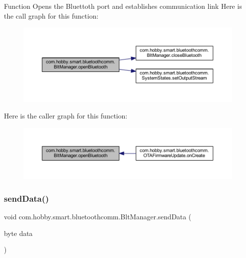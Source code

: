 Function Opens the Bluettoth port and establishes communication link Here is the call graph for this function\+:\nopagebreak
\begin{figure}[H]
\begin{center}
\leavevmode
\includegraphics[width=350pt]{classcom_1_1hobby_1_1smart_1_1bluetoothcomm_1_1_blt_manager_ae6274af1cc3ee13291cc8ef6f365a92f_cgraph}
\end{center}
\end{figure}
Here is the caller graph for this function\+:\nopagebreak
\begin{figure}[H]
\begin{center}
\leavevmode
\includegraphics[width=350pt]{classcom_1_1hobby_1_1smart_1_1bluetoothcomm_1_1_blt_manager_ae6274af1cc3ee13291cc8ef6f365a92f_icgraph}
\end{center}
\end{figure}
\mbox{\label{classcom_1_1hobby_1_1smart_1_1bluetoothcomm_1_1_blt_manager_a9d223f09362d0281ed7960ca18d089eb}} 
\subsubsection{\texorpdfstring{send\+Data()}{sendData()}}
{\footnotesize\ttfamily void com.\+hobby.\+smart.\+bluetoothcomm.\+Blt\+Manager.\+send\+Data (\begin{DoxyParamCaption}\item[{byte}]{data }\end{DoxyParamCaption})}

